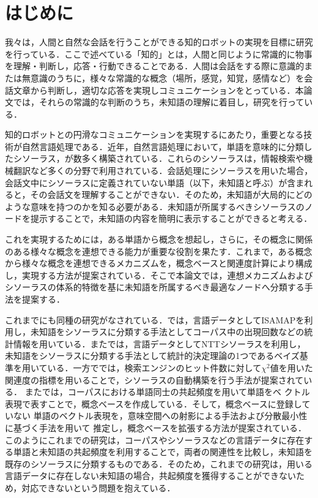 \documentclass[japanese]{jnlp_1.4}
\begin{document}
\maketitle


\section{はじめに}
我々は，人間と自然な会話を行うことができる知的ロボットの実現を目標に研究を行っている．ここで述べている「知的」とは，人間と同じように常識的に物事を理解・判断し，応答・行動できることである．人間は会話をする際に意識的または無意識のうちに，様々な常識的な概念（場所，感覚，知覚，感情など）を会話文章から判断し，適切な応答を実現しコミュニケーションをとっている．本論文では，それらの常識的な判断のうち，未知語の理解に着目し，研究を行っている．

知的ロボットとの円滑なコミュニケーションを実現するにあたり，重要となる技術が自然言語処理である．近年，自然言語処理において，単語を意味的に分類したシソーラス\cite{NTT_Thesaurus:97}，\cite{G.A.Miller:95}が数多く構築されている．これらのシソーラスは，情報検索や機械翻訳など多くの分野で利用されている．会話処理にシソーラスを用いた場合，会話文中にシソーラスに定義されていない単語（以下，未知語と呼ぶ）が含まれると，その会話文を理解することができない．そのため，未知語が大局的にどのような意味を持つのかを知る必要がある．未知語が所属するべきシソーラスのノードを提示することで，未知語の内容を簡明に表示することができると考える．

これを実現するためには，ある単語から概念を想起し，さらに，その概念に関係のある様々な概念を連想できる能力が重要な役割を果たす．これまで，ある概念から様々な概念を連想できるメカニズムを，概念ベース\cite{okumura:07}と関連度計算\cite{watabe:06}により構成し，実現する方法が提案されている．そこで本論文では，連想メカニズムおよびシソーラスの体系的特徴を基に未知語を所属するべき最適なノードへ分類する手法を提案する．

これまでにも同種の研究がなされている．\cite{uramoto:96}では，言語データとしてISAMAP\cite{tanaka:87}を利用し，未知語をシソーラスに分類する手法としてコーパス中の出現回数などの統計情報を用いている．また\cite{maeda:00}では，言語データとしてNTTシソーラス\cite{NTT_Thesaurus:97}を利用し，未知語をシソーラスに分類する手法として統計的決定理論の1つであるベイズ基準を用いている．一方で\cite{sakaki:07}では，検索エンジンのヒット件数に対して$\chi^2$値を用いた関連度の指標を用いることで，シソーラスの自動構築を行う手法が提案されている．
また\cite{bessho:06}では，コーパスにおける単語同士の共起頻度を用いて単語をベ
クトル表現で表すことで，概念ベースを作成している．そして，概念ベースに登録していない
単語のベクトル表現を，意味空間への射影による手法および分散最小性に基づく手法を用いて
推定し，概念ベースを拡張する方法が提案されている．
このようにこれまでの研究は，コーパスやシソーラスなどの言語データに存在する単語と未知語の共起頻度を利用することで，両者の関連性を比較し，未知語を既存のシソーラスに分類するものである．そのため，これまでの研究は，用いる言語データに存在しない未知語の場合，共起頻度を獲得することができないため，対応できないという問題を抱えている．
\end{document}
